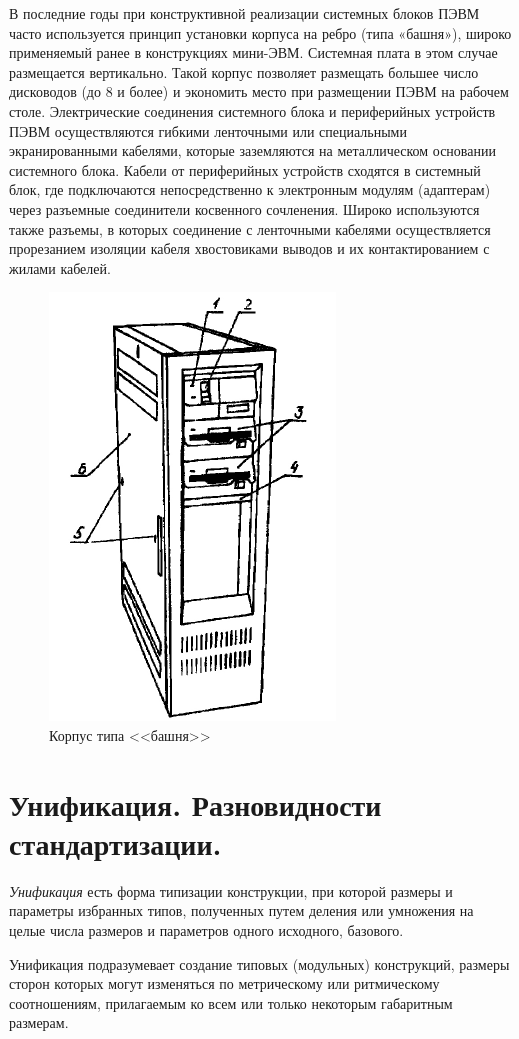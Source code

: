 \documentclass[unicode, 12pt, a4paper, oneside]{article}
\begin{document}
В последние годы при конструктивной реализации системных блоков ПЭВМ часто используется принцип установки корпуса на ребро (типа «башня»), широко применяемый ранее в конструкциях мини-ЭВМ. Системная плата в этом случае размещается вертикально. Такой корпус позволяет размещать большее число дисководов (до 8 и более) и экономить место при размещении ПЭВМ на рабочем столе. Электрические соединения системного блока и периферийных устройств ПЭВМ осуществляются гибкими ленточными или специальными экранированными кабелями, которые заземляются на металлическом основании системного блока. Кабели от периферийных устройств сходятся в системный блок, где подключаются непосредственно к электронным модулям (адаптерам) через разъемные соединители косвенного сочленения. Широко используются также разъемы, в которых соединение с ленточными кабелями осуществляется прорезанием изоляции кабеля хвостовиками выводов и их контактированием с жилами кабелей.

\begin{figure}[H]
\centering
\includegraphics[width=0.25\linewidth]{73_tower.png}
\caption{Корпус типа <<башня>>}
\end{figure}



\section{Унификация. Разновидности стандартизации.}

\textit{Унификация} есть форма типизации конструкции, при которой размеры и параметры избранных типов, полученных путем деления или умножения на целые числа размеров и параметров одного исходного, базового.

Унификация подразумевает создание типовых (модульных) конструкций, размеры сторон которых могут изменяться по метрическому или ритмическому соотношениям, прилагаемым ко всем или только некоторым габаритным размерам. 
\end{document}
